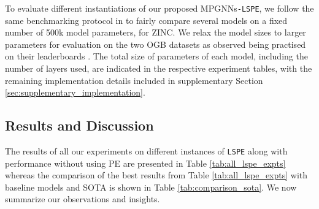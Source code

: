 \documentclass{article} \usepackage{iclr2021_conference,times}
\begin{document}
To evaluate different instantiations of our proposed MPGNNs\texttt{-LSPE}, we follow the same benchmarking protocol in \cite{dwivedi2020benchmarking} to fairly compare several models on a fixed number of 500k model parameters, for ZINC. We relax the model sizes to larger parameters for evaluation on the two OGB datasets as observed being practised on their leaderboards \citep{hu2020ogb}. The total size of parameters of each model, including the number of layers used, are indicated in the respective 
experiment
tables, with the remaining implementation details 
included in supplementary Section \ref{sec:supplementary_implementation}.

\subsection{Results and Discussion}
\label{sec:experiments_results}


The results of all our experiments on different instances of \texttt{LSPE} along with performance without using PE are presented in Table \ref{tab:all_lspe_expts} whereas the comparison of the best results from Table \ref{tab:all_lspe_expts} with baseline models and SOTA is shown in Table \ref{tab:comparison_sota}. We now summarize our observations and insights.
\end{document}

